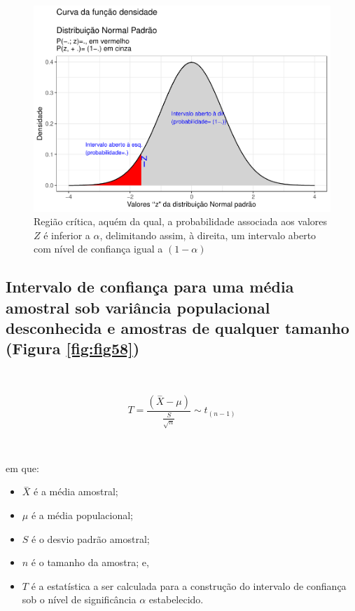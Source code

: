 \documentclass[
]{book}
\providecommand{\tightlist}{%
  \setlength{\itemsep}{0pt}\setlength{\parskip}{0pt}}
\begin{document}
\begin{figure}

{\centering \includegraphics[width=1\linewidth]{apostila_files/figure-latex/fig57-1} 

}

\caption{Região crítica, aquém da qual, a probabilidade associada aos valores $Z$ é inferior a $\alpha$, delimitando assim, à direita, um intervalo aberto com nível de confiança igual a $(1-\alpha)$}\label{fig:fig57}
\end{figure}

\hypertarget{intervalo-de-confianuxe7a-para-uma-muxe9dia-amostral-sob-variuxe2ncia-populacional-desconhecida-e-amostras-de-qualquer-tamanho-figura-reffigfig58}{%
\subsection{Intervalo de confiança para uma média amostral sob variância populacional desconhecida e amostras de qualquer tamanho (Figura \ref{fig:fig58})}\label{intervalo-de-confianuxe7a-para-uma-muxe9dia-amostral-sob-variuxe2ncia-populacional-desconhecida-e-amostras-de-qualquer-tamanho-figura-reffigfig58}}

~

\[
T = \frac{(\stackrel{-}{X} - \mu)}{    \frac{S}{\sqrt{n}} } \sim t_{(n-1)}
\]

~

em que:

\hfill\break

\begin{itemize}
\tightlist
\item
  \(\stackrel{-}{X}\) é a média amostral;\\
\item
  \(\mu\) é a média populacional;\\
\item
  \(S\) é o desvio padrão amostral;\\
\item
  \(n\) é o tamanho da amostra; e,
\item
  \(T\) é a estatística a ser calculada para a construção do intervalo de confiança sob o nível de significância \(\alpha\) estabelecido.
\end{itemize}
\end{document}
